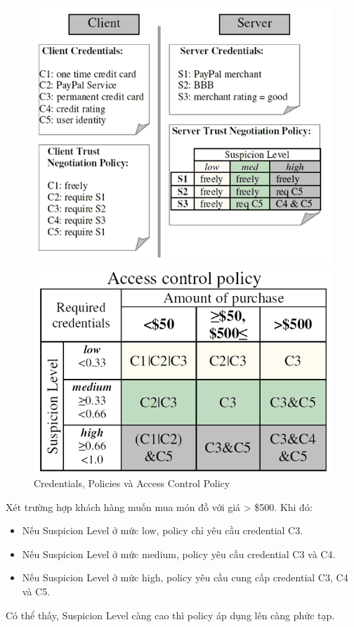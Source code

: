 \documentclass[12pt]{article}
\begin{document}
\begin{figure}[H]
\centering
\begin{multicols}{2}
\includegraphics[scale=.5]{img/atnac-example-1.png}

\includegraphics[scale=.5]{img/atnac-example-2.png}
\end{multicols}
\caption{Credentials, Policies và Access Control Policy}
\end{figure}

Xét trường hợp khách hàng muốn mua món đồ với giá > \$500. Khi đó:
\begin{itemize}
\item Nếu Suspicion Level ở mức low, policy chỉ yêu cầu credential C3.
\item Nếu Suspicion Level ở mức medium, policy yêu cầu credential C3 và C4.
\item Nếu Suspicion Level ở mức high, policy yêu cầu cung cấp credential C3, C4 và C5.
\end{itemize}
Có thể thấy, Suspicion Level càng cao thì policy áp dụng lên càng phức tạp.
\end{document}
